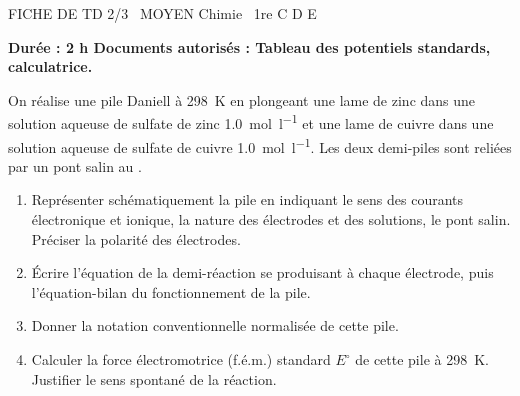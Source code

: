 \documentclass[11pt]{article}
\begin{document}
\begin{tcolorbox}[enhanced,colback=popink,colframe=popink,arc=10pt,boxrule=0pt,left=12pt,right=12pt,top=9pt,bottom=9pt]
{\color{white}\popxbold\small FICHE DE TD 2/3 \textbullet\ MOYEN \hfill Chimie \textbullet\ 1re C D E\par}
\end{tcolorbox}
\vspace{4pt}
\textbf{Durée : 2 h \quad Documents autorisés : Tableau des potentiels standards, calculatrice.}

\begin{exercice}
On réalise une pile Daniell à \SI{298}{\kelvin} en plongeant une lame de zinc dans une solution aqueuse de sulfate de zinc  \SI{1,0}{\mol\per\litre} et une lame de cuivre dans une solution aqueuse de sulfate de cuivre  \SI{1,0}{\mol\per\litre}. Les deux demi-piles sont reliées par un pont salin au .
\begin{enumerate}
    \item Représenter schématiquement la pile en indiquant le sens des courants électronique et ionique, la nature des électrodes et des solutions, le pont salin. Préciser la polarité des électrodes.
    \item Écrire l'équation de la demi-réaction se produisant à chaque électrode, puis l'équation-bilan du fonctionnement de la pile.
    \item Donner la notation conventionnelle normalisée de cette pile.
    \item Calculer la force électromotrice (f.é.m.) standard $E^\circ$ de cette pile à \SI{298}{\kelvin}. Justifier le sens spontané de la réaction.
\end{enumerate}
\end{exercice}
\end{document}
